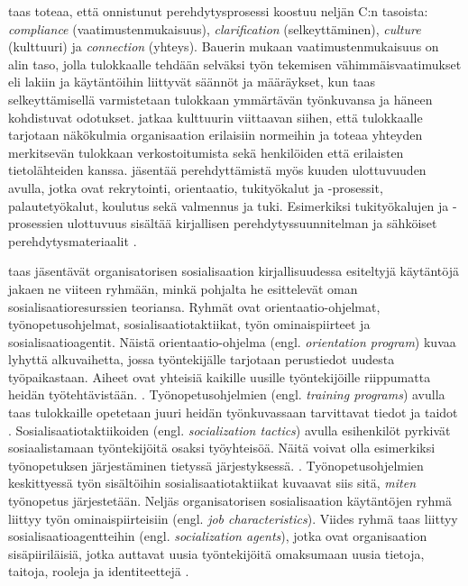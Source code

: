 \documentclass[utf8]{gradu3}
\begin{document}
\textcite{bauer-2010} taas toteaa, että onnistunut perehdytysprosessi koostuu neljän C:n tasoista: \textit{compliance} (vaatimustenmukaisuus), \textit{clarification} (selkeyttäminen), \textit{culture} (kulttuuri) ja \textit{connection} (yhteys). Bauerin mukaan vaatimustenmukaisuus on alin taso, jolla tulokkaalle tehdään selväksi työn tekemisen vähimmäisvaatimukset eli lakiin ja käytäntöihin liittyvät säännöt ja määräykset, kun taas selkeyttämisellä varmistetaan tulokkaan ymmärtävän työnkuvansa ja häneen kohdistuvat odotukset. \textcite{bauer-2010} jatkaa kulttuurin viittaavan siihen, että tulokkaalle tarjotaan näkökulmia organisaation erilaisiin normeihin ja toteaa yhteyden merkitsevän tulokkaan verkostoitumista sekä henkilöiden että erilaisten tietolähteiden kanssa. \textcite{bauer-2010} jäsentää perehdyttämistä myös kuuden ulottuvuuden avulla, jotka ovat rekrytointi, orientaatio, tukityökalut ja -prosessit, palautetyökalut, koulutus sekä valmennus ja tuki. Esimerkiksi tukityökalujen ja -prosessien ulottuvuus sisältää kirjallisen perehdytyssuunnitelman ja sähköiset perehdytysmateriaalit \parencite{bauer-2010}.

\textcite{saks-gruman-2012} taas jäsentävät organisatorisen sosialisaation kirjallisuudessa esiteltyjä käytäntöjä jakaen ne viiteen ryhmään, minkä pohjalta he esittelevät oman sosialisaatioresurssien teoriansa. Ryhmät ovat orientaatio-ohjelmat, työnopetusohjelmat, sosialisaatiotaktiikat, työn ominaispiirteet ja sosialisaatioagentit. Näistä orientaatio-ohjelma (engl. \textit{orientation program}) kuvaa lyhyttä alkuvaihetta, jossa työntekijälle tarjotaan perustiedot uudesta työpaikastaan. Aiheet ovat yhteisiä kaikille uusille työntekijöille riippumatta heidän työtehtävistään. \parencite{saks-gruman-2012}. Työnopetusohjelmien (engl. \textit{training programs}) avulla taas tulokkaille opetetaan juuri heidän työnkuvassaan tarvittavat tiedot ja taidot \parencite{saks-gruman-2012}. Sosialisaatiotaktiikoiden (engl. \textit{socialization tactics}) avulla esihenkilöt pyrkivät sosiaalistamaan työntekijöitä osaksi työyhteisöä. Näitä voivat olla esimerkiksi työnopetuksen järjestäminen tietyssä järjestyksessä. \parencite{saks-gruman-2012}. Työnopetusohjelmien keskittyessä työn sisältöihin sosialisaatiotaktiikat kuvaavat siis sitä, \textit{miten} työnopetus järjestetään. Neljäs organisatorisen sosialisaation käytäntöjen ryhmä liittyy työn ominaispiirteisiin (engl. \textit{job characteristics}). Viides ryhmä taas liittyy sosialisaatioagentteihin (engl. \textit{socialization agents}), jotka ovat organisaation sisäpiiriläisiä, jotka auttavat uusia työntekijöitä omaksumaan uusia tietoja, taitoja, rooleja ja identiteettejä \parencite{saks-gruman-2012}.
\end{document}
